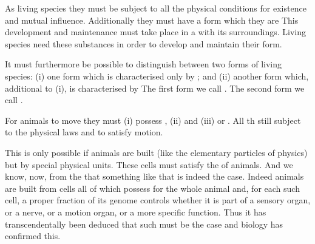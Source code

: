 \label{filo:Living Species}

\begynd
\pind As living species they must be subject to all the physical
      conditions for existence and mutual influence.
\pind Additionally they must have a form which they are 
\pind This development and maintenance must take place in a
      with its surroundings.
\pind Living species need these substances in order to develop and
      maintain their form.

\mnewfoil
\pind It must furthermore be possible to distinguish between two forms
      of living species: 
\begynd
\pind (i) one form which is characterised only by ; and
\pind (ii) another form which, additional to (i), is characterised by
\afslut
\pind The first form we call . %
\pind The second form we call . %
\afslut

\label{filo:Animals}

\begynd
\pind For animals to move they must 
\begynd
\pind (i) possess ,
\pind (ii) 
      and 
\pind (iii)  or .
\afslut
\pind All th still subject to the physical laws and to satisfy motion.
\afslut

\mnewfoil
\begynd 
\pind This is only possible if animals are  built \nyl
      (like the elementary particles of physics) \nyl
      but by special physical units.
\begynd
\pind These cells must satisfy the  of animals.
\pind And we know, now, from the 
      that something like that is indeed the case.
\pind Indeed animals are built from cells all of which possess
      for the whole animal
\pind and, for each such cell, a  proper fraction of its genome \nyl
      controls whether it is part of a sensory organ, or a nerve, or a
      motion organ, or a more specific function. 
\afslut
\pind Thus it has transcendentally been deduced \nyl that such must be the
      case \nyl and biology has confirmed this.
\afslut
{}


